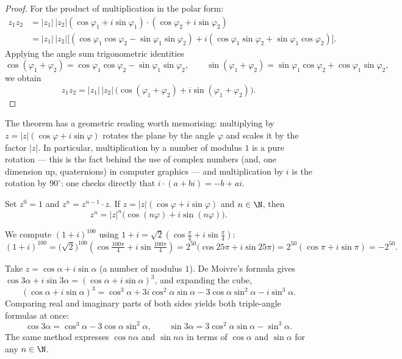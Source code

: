 \begin{proof}
For the product of multiplication in the polar form:
\begin{align*}
z_1 z_2 &= |z_1|\,|z_2|(\cos \varphi_1 + i\sin\varphi_1) \cdot (\cos \varphi_2 + i\sin\varphi_2) \\
&= |z_1|\,|z_2| \Big[ (\cos\varphi_1 \cos\varphi_2 - \sin\varphi_1 \sin\varphi_2) + i (\cos\varphi_1 \sin\varphi_2 + \sin\varphi_1 \cos\varphi_2) \Big].
\end{align*}
Applying the angle sum trigonometric identities
\[
\cos(\varphi_1 + \varphi_2) = \cos\varphi_1 \cos\varphi_2 - \sin\varphi_1 \sin\varphi_2, \qquad
\sin(\varphi_1 + \varphi_2) = \sin\varphi_1 \cos\varphi_2 + \cos\varphi_1 \sin\varphi_2,
\]
we obtain
\[
z_1 z_2 = |z_1|\,|z_2|\,\big(\cos (\varphi_1+\varphi_2) + i\sin(\varphi_1+\varphi_2)\big).
\]

\end{proof}

\begin{remark}
The theorem has a geometric reading worth memorising: multiplying by $z = |z|(\cos\varphi+i\sin\varphi)$
rotates the plane by the angle $\varphi$ and scales it by the factor $|z|$. In particular, multiplication by
a number of modulus $1$ is a pure rotation — this is the fact behind the use of complex numbers (and, one
dimension up, quaternions) in computer graphics — and multiplication by $i$ is the rotation by $90^\circ$:
one checks directly that $i\cdot(a+bi) = -b+ai$.
\end{remark}

\begin{theorem}
Set $z^0 = 1$ and $z^n = z^{n-1}\cdot z$. If $z=|z|(\cos \varphi + i\sin\varphi)$ and $n\in \N$, then
\[
z^n = |z|^n \big(\cos (n\varphi) + i\sin(n \varphi)\big).
\]
\end{theorem}

\begin{example}
We compute $(1+i)^{100}$ using $1+i = \sqrt{2}(\cos\tfrac\pi4 + i\sin\tfrac\pi4)$:
\[
(1+i)^{100} = \big(\sqrt{2}\big)^{100}\left(\cos\tfrac{100\pi}{4} + i \sin\tfrac{100\pi}{4}\right)
= 2^{50}\big(\cos 25\pi +i \sin 25\pi\big) = 2^{50}(\cos \pi + i \sin \pi) = -2^{50}.
\]
\end{example}

\begin{example}
Take $z = \cos\alpha + i\sin\alpha$ (a number of modulus $1$). De Moivre's formula gives
$\cos 3\alpha + i \sin 3\alpha = (\cos\alpha + i \sin \alpha)^3$, and expanding the cube,
\[
(\cos\alpha + i\sin\alpha)^3
= \cos^3\alpha + 3i\cos^2\alpha \sin\alpha - 3\cos\alpha\sin^2\alpha - i\sin^3\alpha.
\]
Comparing real and imaginary parts of both sides yields both triple-angle formulas at once:
\[
\cos 3\alpha = \cos^3\alpha - 3\cos\alpha \sin^2\alpha, \qquad
\sin 3\alpha = 3\cos^2\alpha\sin\alpha - \sin^3\alpha.
\]
The same method expresses $\cos n\alpha$ and $\sin n\alpha$ in terms of $\cos\alpha$ and $\sin\alpha$ for
any $n\in\N$.
\end{example}

